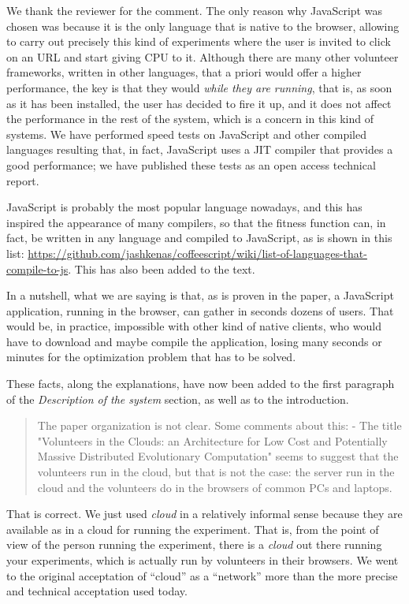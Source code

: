 \documentclass[preprint]{elsarticle}
\begin{document}
We thank the reviewer for the comment. The only reason why JavaScript
was chosen was because it is the only language that is native to the
browser, allowing to carry out precisely this kind of experiments
where the user is invited to click on an URL and start giving CPU to
it. Although there are many other volunteer frameworks, written in
other languages, that a priori would offer a higher performance, the
key is that they would {\em while they are running}, that is, as soon
as it has been installed, the user has decided to fire it up, and it
does not affect the performance in the rest of the system, which is a
concern in this kind of systems. We have performed speed tests on
JavaScript and other compiled languages resulting that, in fact,
JavaScript uses a JIT compiler that provides a good performance; we
have published these tests as an open access technical report.  %

JavaScript is probably the most popular language nowadays, and this
has inspired the appearance of many compilers, so that the fitness
function can, in fact, be written in any language and compiled to
JavaScript, as is shown in this list:
\url{https://github.com/jashkenas/coffeescript/wiki/list-of-languages-that-compile-to-js}. This
has also been added to the text.

In a nutshell, what we are saying is that, as is proven in the paper,
a JavaScript application, running in the browser, can gather in
seconds dozens of users. That would be, in practice, impossible with
other kind of native clients, who would have to download and maybe
compile the application, losing many seconds or minutes for the
optimization problem that has to be solved.

These facts, along the explanations, have now been added to the first
paragraph of the {\em Description of the system} section, as well as
to the introduction.

\begin{quote}
The paper organization is not clear. Some comments about this:
- The title "Volunteers in the Clouds: an Architecture for Low Cost and Potentially Massive Distributed
Evolutionary Computation" seems to suggest that the volunteers run in the cloud, but that is not the case:
the server run in the cloud and the volunteers do in the browsers of
common PCs and laptops.
\end{quote}

That is correct. We just used {\em cloud} in a relatively informal
sense because they are available as in a cloud for running the
experiment. That is, from the point of view of the person running the
experiment, there is a {\em cloud} out there running your experiments,
which is actually run by volunteers in their browsers. We went to the
original acceptation of ``cloud'' as a ``network'' more than the more
precise and technical acceptation used today. %
\end{document}
